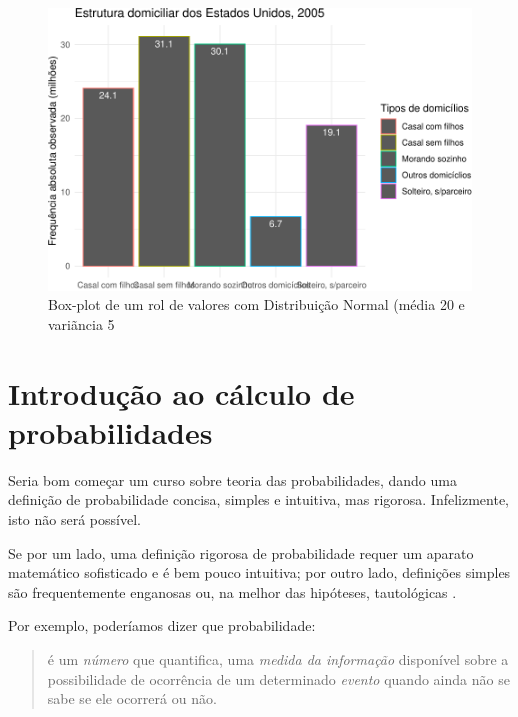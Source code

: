 \documentclass[
]{book}
\begin{document}
\begin{figure}

{\centering \includegraphics{apostila_files/figure-latex/unnamed-chunk-48-1} 

}

\caption{Box-plot de um rol de valores com Distribuição Normal (média 20 e variãncia 5}\label{fig:unnamed-chunk-48}
\end{figure}

\hypertarget{introduuxe7uxe3o-ao-cuxe1lculo-de-probabilidades}{%
\chapter{Introdução ao cálculo de probabilidades}\label{introduuxe7uxe3o-ao-cuxe1lculo-de-probabilidades}}

Seria bom começar um curso sobre teoria das probabilidades, dando uma definição de probabilidade concisa, simples e intuitiva, mas rigorosa. Infelizmente, isto não será possível.

Se por um lado, uma definição rigorosa de probabilidade requer um aparato matemático sofisticado e é bem pouco intuitiva; por outro lado, definições simples são frequentemente enganosas ou, na melhor das hipóteses, tautológicas .

Por exemplo, poderíamos dizer que probabilidade:

\begin{quote}
é um \emph{número} que quantifica, uma \emph{medida da informação} disponível sobre a possibilidade de ocorrência de um determinado \emph{evento} quando ainda não se sabe se ele ocorrerá ou não.
\end{quote}
\end{document}
